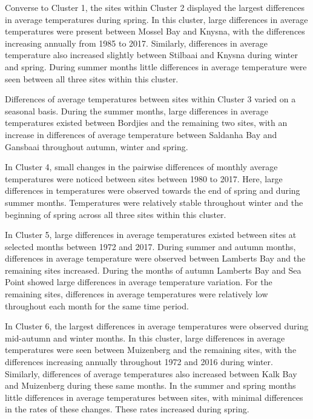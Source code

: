 \documentclass[10pt,a4paper,]{article}
\begin{document}
Converse to Cluster 1, the sites within Cluster 2 displayed the largest
differences in average temperatures during spring. In this cluster,
large differences in average temperatures were present between Mossel
Bay and Knysna, with the differences increasing annually from 1985 to
2017. Similarly, differences in average temperature also increased
slightly between Stilbaai and Knysna during winter and spring. During
summer months little differences in average temperature were seen
between all three sites within this cluster.

Differences of average temperatures between sites within Cluster 3
varied on a seasonal basis. During the summer months, large differences
in average temperatures existed between Bordjies and the remaining two
sites, with an increase in differences of average temperature between
Saldanha Bay and Gansbaai throughout autumn, winter and spring.

In Cluster 4, small changes in the pairwise differences of monthly
average temperatures were noticed between sites between 1980 to 2017.
Here, large differences in temperatures were observed towards the end of
spring and during summer months. Temperatures were relatively stable
throughout winter and the beginning of spring across all three sites
within this cluster.

In Cluster 5, large differences in average temperatures existed between
sites at selected months between 1972 and 2017. During summer and autumn
months, differences in average temperature were observed between
Lamberts Bay and the remaining sites increased. During the months of
autumn Lamberts Bay and Sea Point showed large differences in average
temperature variation. For the remaining sites, differences in average
temperatures were relatively low throughout each month for the same time
period.

In Cluster 6, the largest differences in average temperatures were
observed during mid-autumn and winter months. In this cluster, large
differences in average temperatures were seen between Muizenberg and the
remaining sites, with the differences increasing annually throughout
1972 and 2016 during winter. Similarly, differences of average
temperatures also increased between Kalk Bay and Muizenberg during these
same months. In the summer and spring months little differences in
average temperatures between sites, with minimal differences in the
rates of these changes. These rates increased during spring.
\end{document}
